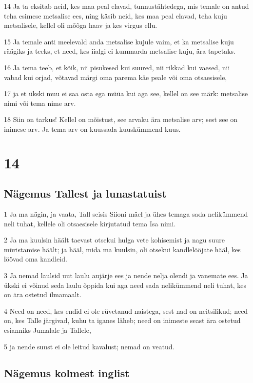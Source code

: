 \par 14 Ja ta eksitab neid, kes maa peal elavad, tunnustähtedega, mis temale on antud teha esimese metsalise ees, ning käsib neid, kes maa peal elavad, teha kuju metsalisele, kellel oli mõõga haav ja kes virgus ellu.
\par 15 Ja temale anti meelevald anda metsalise kujule vaim, et ka metsalise kuju räägiks ja teeks, et need, kes iialgi ei kummarda metsalise kuju, ära tapetaks.
\par 16 Ja tema teeb, et kõik, nii pisukesed kui suured, nii rikkad kui vaesed, nii vabad kui orjad, võtavad märgi oma parema käe peale või oma otsaesisele,
\par 17 ja et ükski muu ei saa osta ega müüa kui aga see, kellel on see märk: metsalise nimi või tema nime arv.
\par 18 Siin on tarkus! Kellel on mõistust, see arvaku ära metsalise arv; sest see on inimese arv. Ja tema arv on kuussada kuuskümmend kuus.


\chapter{14}

\section*{Nägemus Tallest ja lunastatuist}

\par 1 Ja ma nägin, ja vaata, Tall seisis Siioni mäel ja ühes temaga sada nelikümmend neli tuhat, kellele oli otsaesisele kirjutatud tema Isa nimi.
\par 2 Ja ma kuulsin häält taevast otsekui hulga vete kohisemist ja nagu suure müristamise häält; ja hääl, mida ma kuulsin, oli otsekui kandlelööjate hääl, kes löövad oma kandleid.
\par 3 Ja nemad laulsid uut laulu aujärje ees ja nende nelja olendi ja vanemate ees. Ja ükski ei võinud seda laulu õppida kui aga need sada nelikümmend neli tuhat, kes on ära ostetud ilmamaalt.
\par 4 Need on need, kes endid ei ole rüvetanud naistega, sest nad on neitsilikud; need on, kes Talle järgivad, kuhu ta iganes läheb; need on inimeste seast ära ostetud esianniks Jumalale ja Tallele,
\par 5 ja nende suust ei ole leitud kavalust; nemad on veatud.

\section*{Nägemus kolmest inglist}

